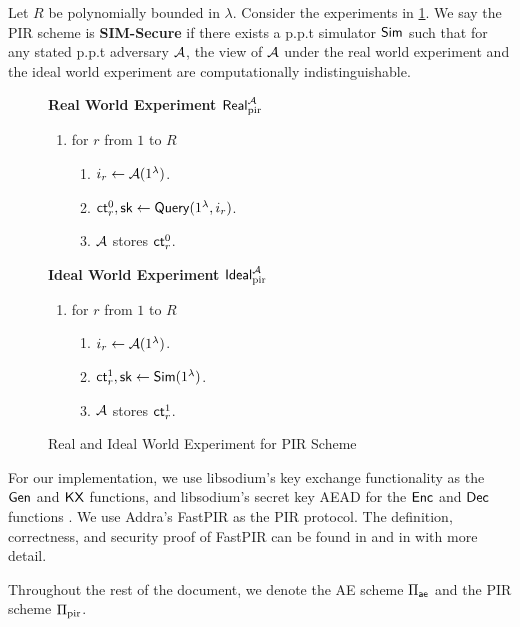 \begin{definition}
\label{defn:PIR-SIM-security}
Let $R$ be polynomially bounded in $\lambda$. Consider the experiments in \cref{expr:pir-real-ideal-world}. We say the PIR scheme is \textbf{SIM-Secure} if there exists a p.p.t simulator $\mathsf{Sim}$ such that for any stated p.p.t adversary $\mathcal{A}$, the view of $\mathcal{A}$ under the real world experiment and the ideal world experiment are computationally indistinguishable. 

\begin{figure}[h!]
\begin{framed}
\textbf{Real World Experiment $\mathsf{Real}^{\mathcal{A}}_{\text{pir}}$}
\begin{enumerate}
    \item for $r$ from $1$ to $R$
    \begin{enumerate}
        \item $i_r \leftarrow \mathcal{A}(1^{\lambda})$.
        \item $\mathsf{ct}_r^0, {\mathsf{sk}} \leftarrow \mathsf{Query}(1^{\lambda}, i_r)$.
        \item $\mathcal{A}$ stores $\mathsf{ct}_r^0$.
    \end{enumerate}
\end{enumerate}
\textbf{Ideal World Experiment $\mathsf{Ideal}^{\mathcal{A}}_{\text{pir}}$}
\begin{enumerate}
    \item for $r$ from $1$ to $R$
    \begin{enumerate}
        \item $i_r \leftarrow \mathcal{A}(1^{\lambda})$.
        \item $\mathsf{ct}_r^1, {\mathsf{sk}} \leftarrow \mathsf{Sim}(1^{\lambda})$.
        \item $\mathcal{A}$ stores $\mathsf{ct}_r^1$.
    \end{enumerate}
\end{enumerate}
\end{framed}
\caption{Real and Ideal World Experiment for PIR Scheme}
\label{expr:pir-real-ideal-world}
\end{figure}
\end{definition}
For our implementation, we use libsodium's key exchange functionality as the $\mathsf{Gen}$ and $\mathsf{KX}$ functions, and libsodium's secret key AEAD for the $\mathsf{Enc}$ and $\mathsf{Dec}$ functions \cite{libsodium}. We use Addra's FastPIR as the PIR protocol. The definition, correctness, and security proof of FastPIR can be found in \cite[Section 4]{ahmad2021addra} and in \cite{angel2018thesis} with more detail.

Throughout the rest of the document, we denote the AE scheme $\Pi_{\mathsf{ae}}$ and the PIR scheme $\Pi_{\text{pir}}$.
